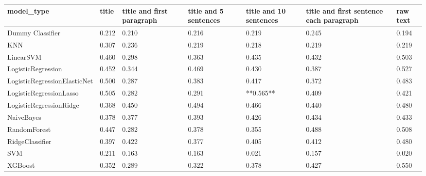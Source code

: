 \begin{tabular}{lllllll}
\toprule
                  model\_type & title & title and first paragraph & title and 5 sentences & title and 10 sentences & title and first sentence each paragraph & raw text \\
\midrule
            Dummy Classifier & 0.212 &                     0.210 &                 0.216 &                  0.219 &                                   0.245 &    0.194 \\
                         KNN & 0.307 &                     0.236 &                 0.219 &                  0.218 &                                   0.219 &    0.219 \\
                   LinearSVM & 0.460 &                     0.298 &                 0.363 &                  0.435 &                                   0.432 &    0.503 \\
          LogisticRegression & 0.452 &                     0.344 &                 0.469 &                  0.430 &                                   0.387 &    0.527 \\
LogisticRegressionElasticNet & 0.500 &                     0.287 &                 0.383 &                  0.417 &                                   0.372 &    0.483 \\
     LogisticRegressionLasso & 0.505 &                     0.282 &                 0.291 &              **0.565** &                                   0.409 &    0.421 \\
     LogisticRegressionRidge & 0.368 &                     0.450 &                 0.494 &                  0.466 &                                   0.440 &    0.480 \\
                  NaiveBayes & 0.378 &                     0.377 &                 0.393 &                  0.426 &                                   0.434 &    0.433 \\
                RandomForest & 0.447 &                     0.282 &                 0.378 &                  0.355 &                                   0.488 &    0.508 \\
             RidgeClassifier & 0.397 &                     0.422 &                 0.377 &                  0.405 &                                   0.412 &    0.480 \\
                         SVM & 0.211 &                     0.163 &                 0.163 &                  0.021 &                                   0.157 &    0.020 \\
                     XGBoost & 0.352 &                     0.289 &                 0.322 &                  0.378 &                                   0.427 &    0.550 \\
\bottomrule
\end{tabular}

